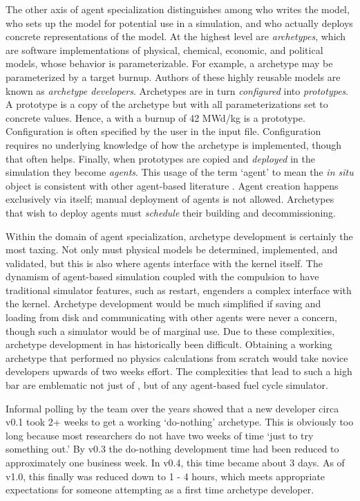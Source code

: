 The other axis of agent specialization distinguishes among who 
writes the model, who sets up the model for potential use in a simulation,
and who actually deploys concrete representations of the model.
At the highest level are \emph{archetypes}, which are software implementations
of physical, chemical, economic, and political models, whose behavior
is parameterizable. For example, a   archetype may be 
parameterized by a target burnup. Authors of these highly reusable models 
are known as \emph{archetype developers}. Archetypes are in turn 
\emph{configured} into \emph{prototypes}. A prototype is a copy 
of the archetype but with all parameterizations set to concrete 
values. Hence, a  with a burnup of 42 MWd/kg is a 
prototype. Configuration is often specified by the \cyclus user 
in the input file. Configuration requires no underlying knowledge of 
how the archetype is implemented, though that often helps.
Finally, when prototypes are copied and \emph{deployed} in the simulation 
they become \emph{agents}. This usage of the term `agent' to mean 
the \emph{in situ} object is consistent with other agent-based
literature \citeme.  Agent creation happens exclusively via 
\cyclus itself; manual deployment of agents is not allowed.
Archetypes that wish to deploy agents must \emph{schedule} their building
and decommissioning.

Within the domain of agent specialization, archetype development is certainly 
the most taxing.
Not only must physical models be determined, implemented, and 
validated, but this is also where agents interface with the 
\cyclus kernel itself. The dynamism of agent-based simulation 
coupled with the compulsion to have traditional simulator features, 
such as restart, engenders a complex interface with the kernel.
Archetype development would be much simplified if saving and 
loading from disk and communicating with other agents were 
never a concern, though such a simulator would be of marginal use.
Due to these complexities, archetype development in \cyclus
has historically been difficult. Obtaining a working archetype
that performed no physics calculations from scratch would 
take novice developers upwards of two weeks effort.  The complexities
that lead to such a high bar are emblematic not just of \cyclus,
but of any agent-based fuel cycle simulator.

Informal polling by the \cyclus team over the years
showed that a new developer circa \cyclus v0.1
took 2+ weeks to get a working `do-nothing' archetype. This is obviously 
too long because most researchers do not have two weeks of time `just to try 
something out.' By \cyclus v0.3 the do-nothing development time had been reduced 
to approximately one business week. In \cyclus v0.4, this time became about 3 days.
As of \cyclus v1.0, this finally was reduced down to 1 - 4 hours, which meets
appropriate expectations for someone attempting \cyclus as a first time archetype 
developer.

